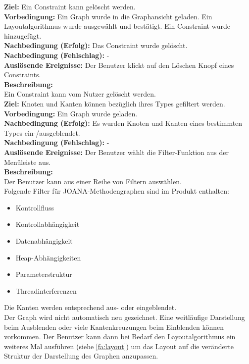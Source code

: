 \label{fa:deleteconstraint}
\textbf{Ziel:} Ein Constraint kann gelöscht werden. \\
\textbf{Vorbedingung:} Ein Graph wurde in die Graphansicht geladen. Ein Layoutalgorithmus wurde ausgewählt und bestätigt. Ein Constraint wurde hinzugefügt. \\
\textbf{Nachbedingung (Erfolg):} Das Constraint wurde gelöscht.\\
\textbf{Nachbedingung (Fehlschlag):} - \\
\textbf{Auslösende Ereignisse:} Der Benutzer klickt auf den Löschen Knopf eines Constraints.\\
\textbf{Beschreibung:}\\
Ein Constraint kann vom Nutzer gelöscht werden.\\

\label{fa:filter}
\textbf{Ziel:} Knoten und Kanten können bezüglich ihres Types gefiltert werden.\\
\textbf{Vorbedingung:} Ein Graph wurde geladen.\\
\textbf{Nachbedingung (Erfolg):} Es wurden Knoten und Kanten eines bestimmten Types ein-/ausgeblendet.\\
\textbf{Nachbedingung (Fehlschlag):} -\\
\textbf{Auslösende Ereignisse:}
Der Benutzer wählt die Filter-Funktion aus der Menüleiste aus.\\
\textbf{Beschreibung:}\\
Der Benutzer kann aus einer Reihe von Filtern auswählen.\\
Folgende Filter für JOANA-Methodengraphen sind im Produkt enthalten:
\begin{itemize}[nolistsep]
  \item Kontrollfluss
  \item Kontrollabhängigkeit
  \item Datenabhängigkeit
  \item Heap-Abhängigkeiten
  \item Parameterstruktur
  \item Threadinterferenzen
\end{itemize}
Die Kanten werden entsprechend aus- oder eingeblendet.\\
Der Graph wird nicht automatisch neu gezeichnet. Eine weitläufige Darstellung beim Ausblenden oder viele Kantenkreuzungen beim Einblenden können vorkommen.
Der Benutzer kann dann bei Bedarf den Layoutalgorithmus ein weiteres Mal ausführen (siehe \ref{fa:layout}) um das Layout auf die
veränderte Struktur der Darstellung des Graphen anzupassen.\\


